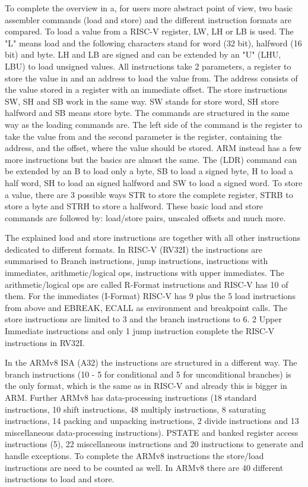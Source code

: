 \documentclass[conference]{IEEEtran}
\begin{document}
	To complete the overview in a, for users more abstract point of view, two basic assembler commands (load and store) and the different instruction formats are compared.
	To load a value from a RISC-V register, LW, LH or LB is used. The "L" means load and the following characters stand for word (32 bit), halfword (16 bit) and byte. LH and LB are signed and can be extended by an "U" (LHU, LBU) to load unsigned values. \cite{Waterman2017}
	All instructions take 2 parameters, a register to store the value in and an address to load the value from. The address consists of the value stored in a register with an immediate offset.
	The store instructions SW, SH and SB work in the same way. SW stands for store word, SH store halfword and SB means store byte. The commands are structured in the same way as the loading commands are. The left side of the command is the register to take the value from and the second parameter is the register, containing the address, and the offset, where the value should be stored.  \cite{Berkeley2019} 
	ARM instead has a few more instructions but the basics are almost the same. The (LDR) command can be extended by an B to load only a byte, SB to load a signed byte, H to load a half word, SH to load an signed halfword and SW to load a signed word. To store a value, there are 3 possible ways STR to store the complete register, STRB to store a byte and STRH to store a halfword. These basic load and store commands are followed by: load/store pairs, unscaled offsets and much more. \cite{Arm2020}

	The explained load and store instructions are together with all other instructions dedicated to different formats.
	In RISC-V (RV32I) the instructions are summarised to Branch instructions, jump instructions, instructions with immediates, arithmetic/logical ops, instructions with upper immediates.
	The arithmetic/logical ops are called R-Format instructions and RISC-V has 10 of them.  For the immediates (I-Format) RISC-V has 9 plus the 5 load instructions from above and EBREAK, ECALL as  environment and breakpoint calls. The store instructions are limited to 3 and the branch instructions to 6. 2 Upper Immediate instructions and only 1 jump instruction complete the RISC-V instructions in RV32I.\cite{Waterman2017}
	
	In the ARMv8 \gls{ISA} (A32) the instructions are structured in a different way.
	The branch instructions (10 -  5 for conditional and 5 for unconditional branches) is the only format, which is the same as in RISC-V and already this is bigger in ARM. Further ARMv8 has data-processing instructions (18 standard instructions, 10 shift instructions, 48 multiply instructions, 8 saturating instructions, 14 packing and unpacking instructions, 2 divide instructions and 13 miscellaneous data-processing instructions). PSTATE and banked register access instructions (5), 22 miscellaneous instructions and 20 instructions to generate and handle exceptions. To complete the ARMv8 instructions the store/load instructions are need to be counted as well. In ARMv8 there are 40 different instructions to load and store. \cite{Arm2020}
	
\end{document}
